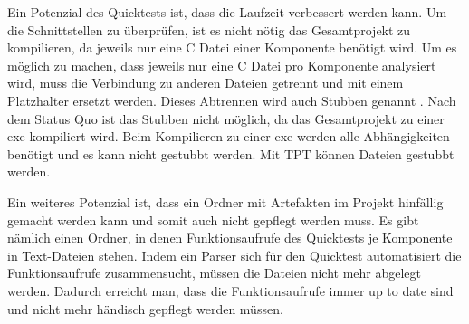 Ein Potenzial des Quicktests ist, dass die Laufzeit verbessert werden kann. Um die Schnittstellen zu überprüfen, ist es
nicht nötig das Gesamtprojekt zu kompilieren, da jeweils nur eine C Datei einer Komponente benötigt wird. 
Um es möglich zu machen, dass jeweils 
nur eine C Datei pro Komponente analysiert wird, muss die Verbindung zu anderen Dateien getrennt und mit einem Platzhalter ersetzt werden.
Dieses Abtrennen wird auch Stubben genannt \cite[vgl.][S. 337]{integration}.
Nach dem Status Quo ist das Stubben nicht möglich, da das Gesamtprojekt zu 
einer \ac{exe} kompiliert wird. Beim Kompilieren zu einer \ac{exe} werden alle Abhängigkeiten benötigt und es kann nicht gestubbt werden.
Mit TPT können Dateien gestubbt werden.


Ein weiteres Potenzial ist, dass ein Ordner mit Artefakten im Projekt hinfällig gemacht werden kann und somit 
auch nicht gepflegt werden muss. Es gibt nämlich einen Ordner, in denen Funktionsaufrufe des Quicktests je Komponente
in Text-Dateien stehen. Indem ein Parser sich für den Quicktest automatisiert die Funktionsaufrufe zusammensucht, 
müssen die Dateien nicht mehr abgelegt werden.
Dadurch erreicht man, dass die Funktionsaufrufe immer up to date sind und nicht mehr händisch gepflegt werden müssen.








